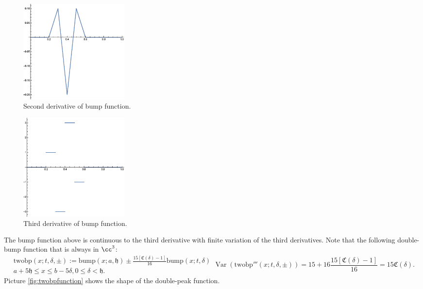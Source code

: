\documentclass{iitthesis}
\DeclareMathOperator{\Var}{Var}
\theoremstyle{definition}
\theoremstyle{remark}
\begin{document}
\begin{figure}[h]
\centering
\includegraphics[width=5.5cm]{bumpp2.eps}
\caption{Second derivative of bump function. \label{fig:bumpp2}}
\end{figure}
\begin{figure}[h]
\centering
\includegraphics[width=5.5cm]{bumpp3.eps}
\caption{Third derivative of bump function. \label{fig:bumpp3}}
\end{figure}
The bump function above is continuous to the third derivative with finite variation of the third derivatives. Note that the following double-bump function that is always in $\cc^3$:
\begin{subequations}
    \begin{multline}\label{foolingfunctionsim}
        \text{twobp}(x;t,\delta,\pm):=\text{bump}(x;a,\mathfrak{h})\pm\frac{15[\mathfrak{C}(\delta)-1]}{16}\text{bump}(x;t,\delta)\\ a+5\mathfrak{h}\le x \le b-5\delta, 0\le \delta <\mathfrak{h}.
    \end{multline}
    \begin{equation}
        \Var(\text{twobp}'''(x;t,\delta,\pm))=15+16\frac{15[\mathfrak{C}(\delta)-1]}{16}=15\mathfrak{C}(\delta).
    \end{equation}
\end{subequations}
Picture \ref{fig:twobpfunction} shows the shape of the double-peak function.
\end{document}
